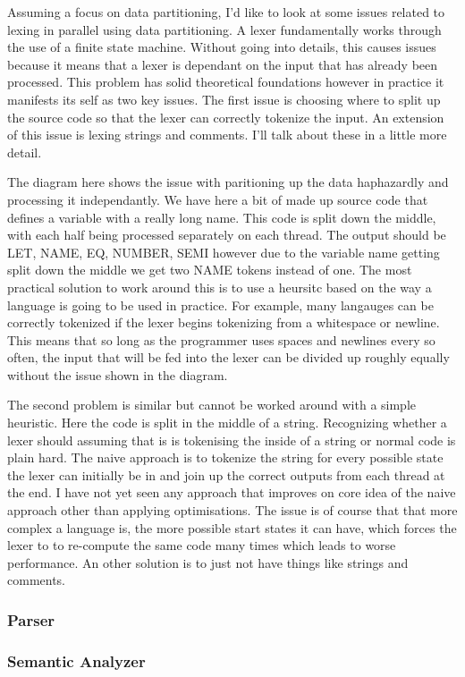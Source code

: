 \begin{roughwork}

	Assuming a focus on data partitioning, I’d like to look at some issues related
	to lexing in parallel using data partitioning. A lexer fundamentally works
	through the use of a finite state machine. Without going into details, this
	causes issues because it means that a lexer is dependant on the input that has
	already been processed. This problem has solid theoretical foundations however
	in practice it manifests its self as two key issues. The first issue is choosing
	where to split up the source code so that the lexer can correctly tokenize the
	input. An extension of this issue is lexing strings and comments. I’ll talk
	about these in a little more detail.

	The diagram here shows the issue with paritioning up the data haphazardly and
	processing it independantly. We have here a bit of made up source code that
	defines a variable with a really long name. This code is split down the middle,
	with each half being processed separately on each thread. The output should be
	LET, NAME, EQ, NUMBER, SEMI however due to the variable name getting split down
	the middle we get two NAME tokens instead of one. The most practical solution to
	work around this is to use a heursitc based on the way a language is going to be
	used in practice. For example, many langauges can be correctly tokenized if the
	lexer begins tokenizing from a whitespace or newline. This means that so long as
	the programmer uses spaces and newlines every so often, the input that will be
	fed into the lexer can be divided up roughly equally without the issue shown in
	the diagram.

	The second problem is similar but cannot be worked around with a simple
	heuristic. Here the code is split in the middle of a string. Recognizing whether
	a lexer should assuming that is is tokenising the inside of a string or normal
	code is plain hard. The naive approach is to tokenize the string for every
	possible state the lexer can initially be in and join up the correct outputs
	from each thread at the end. I have not yet seen any approach that improves on
	core idea of the naive approach other than applying optimisations. The issue is
	of course that that more complex a language is, the more possible start states
	it can have, which forces the lexer to to re-compute the same code many times
	which leads to worse performance. An other solution is to just not have things
	like strings and comments.

\end{roughwork}

\subsubsection{Parser}

\subsubsection{Semantic Analyzer}
